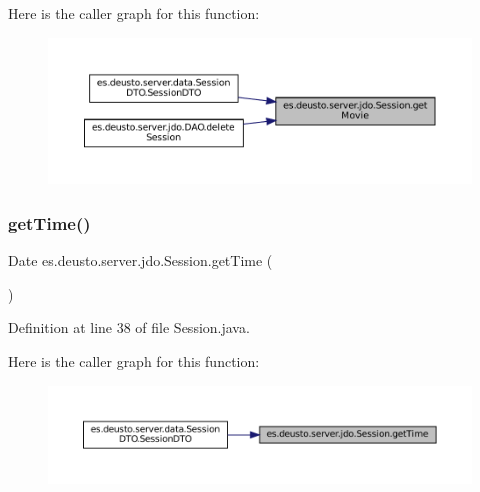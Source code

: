 Here is the caller graph for this function\+:
\nopagebreak
\begin{figure}[H]
\begin{center}
\leavevmode
\includegraphics[width=350pt]{classes_1_1deusto_1_1server_1_1jdo_1_1_session_afdae557964a51e2d6b037db206b344c1_icgraph}
\end{center}
\end{figure}
\mbox{\label{classes_1_1deusto_1_1server_1_1jdo_1_1_session_aa2855c0e0f810bc64c6c84fbfab2f977}} 
\subsubsection{\texorpdfstring{getTime()}{getTime()}}
{\footnotesize\ttfamily Date es.\+deusto.\+server.\+jdo.\+Session.\+get\+Time (\begin{DoxyParamCaption}{ }\end{DoxyParamCaption})}



Definition at line 38 of file Session.\+java.

Here is the caller graph for this function\+:
\nopagebreak
\begin{figure}[H]
\begin{center}
\leavevmode
\includegraphics[width=350pt]{classes_1_1deusto_1_1server_1_1jdo_1_1_session_aa2855c0e0f810bc64c6c84fbfab2f977_icgraph}
\end{center}
\end{figure}
\mbox{\label{classes_1_1deusto_1_1server_1_1jdo_1_1_session_ae4e58ddc0ec278e4f16eba20755b5ceb}} 
